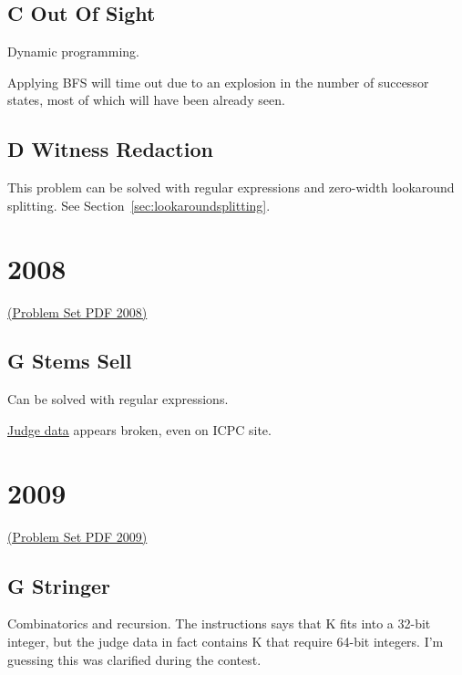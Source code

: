 \subsection{C Out Of Sight}
\label{sec:2007-c-sight}

Dynamic programming.  

Applying BFS will time out due to an explosion in the number
of successor states, most of which will have been already seen.

\subsection{D Witness Redaction}
\label{sec:2007-d-witness}
This problem can be solved with regular expressions and zero-width lookaround splitting.
See Section~\ref{sec:lookaroundsplitting}.

\section{2008}
\href{http://midatl.radford.edu/docs/pastProblems/08contest/MidAtlantic2008.pdf}{(Problem Set PDF 2008)}

\subsection{G Stems Sell}
\label{sec:2008-g-stems}

Can be solved with regular expressions.

\href{http://midatl.radford.edu/docs/pastProblems/08contest/JudgingData/G-stems/}{Judge data}
appears broken, even on ICPC site.


\section{2009}
\href{http://midatl.radford.edu/docs/pastProblems/09contest/MidAtlantic2009.pdf}{(Problem Set PDF 2009)}

\subsection{G Stringer}
\label{sec:2009-g-stringer}

Combinatorics and recursion.  The instructions says that K fits into a 32-bit integer, but 
the judge data in fact contains K that require 64-bit integers.  I'm guessing this was clarified
during the contest.

